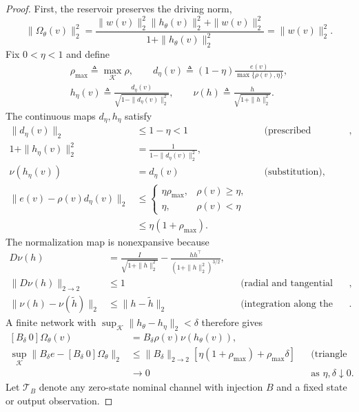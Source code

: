 \documentclass{l4dc2027}
\newcommand{\eqdef}{\triangleq}
\begin{document}
\begin{proof}
First, the reservoir preserves the driving norm,
\[
 \|\Omega_\theta(v)\|_2^2
 =\frac{\|w(v)\|_2^2\|h_\theta(v)\|_2^2+\|w(v)\|_2^2}
        {1+\|h_\theta(v)\|_2^2}
 =\|w(v)\|_2^2.
\]
Fix \mbox{$0<\eta<1$} and define
\[
 \begin{gathered}
 \rho_{\max}\eqdef\max_{\mathcal K}\rho,\qquad
 d_\eta(v)\eqdef(1-\eta)\frac{e(v)}{\max\{\rho(v),\eta\}},\\
 h_\eta(v)\eqdef\frac{d_\eta(v)}{\sqrt{1-\|d_\eta(v)\|_2^2}},\qquad
 \nu(h)\eqdef\frac{h}{\sqrt{1+\|h\|_2^2}}.
 \end{gathered}
\]
The continuous maps \mbox{$d_\eta,h_\eta$} satisfy
\[
 \begin{aligned}
 \|d_\eta(v)\|_2&\le1-\eta<1
 &&\text{(prescribed envelope)},\\
 1+\|h_\eta(v)\|_2^2
 &=\frac{1}{1-\|d_\eta(v)\|_2^2},\\
 \nu(h_\eta(v))&=d_\eta(v)
 &&\text{(substitution)},\\
 \|e(v)-\rho(v)d_\eta(v)\|_2
 &\le\begin{cases}
 \eta\rho_{\max},&\rho(v)\ge\eta,\\
 \eta,&\rho(v)<\eta
 \end{cases}\\
 &\le\eta(1+\rho_{\max}).
 \end{aligned}
\]
The normalization map is nonexpansive because
\[
 \begin{aligned}
 D\nu(h)
 &=\frac{I}{\sqrt{1+\|h\|_2^2}}
   -\frac{hh^\top}{(1+\|h\|_2^2)^{3/2}},\\
 \|D\nu(h)\|_{2\to2}&\le1
 &&\text{(radial and tangential eigenvalues)},\\
 \|\nu(h)-\nu(\widetilde h)\|_2&\le\|h-\widetilde h\|_2
 &&\text{(integration along the segment)}.
 \end{aligned}
\]
A finite network with \mbox{$\sup_{\mathcal K}\|h_\theta-h_\eta\|_2<\delta$} therefore gives
\[
 \begin{aligned}
 {}[B_\delta\ 0]\Omega_\theta(v)
 &=B_\delta\rho(v)\nu(h_\theta(v)),\\
 \sup_{\mathcal K}\|B_\delta e-[B_\delta\ 0]\Omega_\theta\|_2
 &\le\|B_\delta\|_{2\to2}
 \left[\eta(1+\rho_{\max})+\rho_{\max}\delta\right]
 &&\text{(triangle inequality)}\\
 &\longrightarrow0
 &&\text{as }\eta,\delta\downarrow0.
 \end{aligned}
\]
Let \mbox{$\mathcal T_B$} denote any zero-state nominal channel with injection \mbox{$B$} and a fixed state or output observation.

\end{proof}
\end{document}
